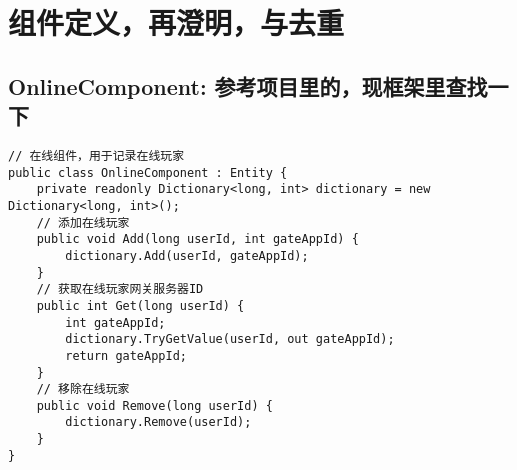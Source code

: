 \documentclass[9pt, b5paper]{article}
\begin{document}
\section{组件定义，再澄明，与去重}
\label{sec-8}
\subsection{OnlineComponent: 参考项目里的，现框架里查找一下}
\label{sec-8-1}
\begin{verbatim}
// 在线组件，用于记录在线玩家
public class OnlineComponent : Entity {
    private readonly Dictionary<long, int> dictionary = new Dictionary<long, int>();
    // 添加在线玩家
    public void Add(long userId, int gateAppId) {
        dictionary.Add(userId, gateAppId);
    }
    // 获取在线玩家网关服务器ID
    public int Get(long userId) {
        int gateAppId;
        dictionary.TryGetValue(userId, out gateAppId);
        return gateAppId;
    }
    // 移除在线玩家
    public void Remove(long userId) {
        dictionary.Remove(userId);
    }
}
\end{verbatim}
\end{document}
